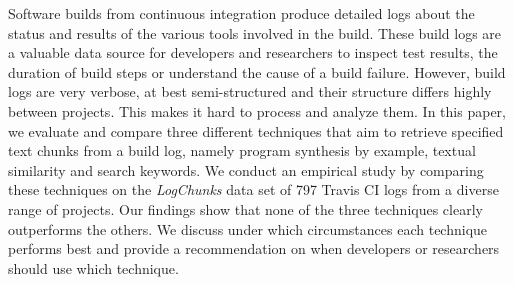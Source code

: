 Software builds from continuous integration produce detailed logs about the status and results of the various tools involved in the build.
These build logs are a valuable data source for developers and researchers to inspect test results, the duration of build steps or understand the cause of a build failure.
However, build logs are very verbose, at best semi-structured and their structure differs highly between projects.
This makes it hard to process and analyze them.
In this paper, we evaluate and compare three different techniques that aim to retrieve specified text chunks from a build log, namely program synthesis by example, textual similarity and search keywords.
We conduct an empirical study by comparing these techniques on the \emph{LogChunks} data set of 797 Travis CI logs from a diverse range of projects.
Our findings show that none of the three techniques clearly outperforms the others.
We discuss under which circumstances each technique performs best and provide a recommendation on when developers or researchers should use which technique.

